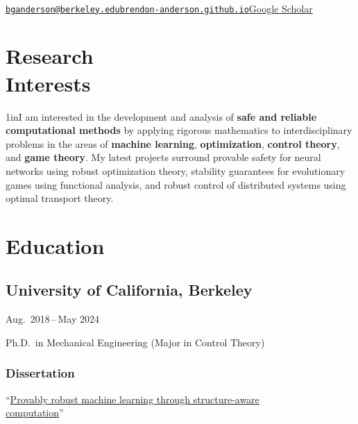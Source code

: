 \documentclass[11pt]{article}
\newcommand{\sectionwidth}{1in}		%
\renewcommand{\maketitle}{%
	\begin{center}
		{\huge\bfseries\theauthor}\\
		\vspace*{1em}%
		{\href{mailto:\theemail}{\texttt{\theemail}}\qquad\href{https://\thewebsite}{\texttt{\thewebsite}}\qquad\href{\thescholar}{Google Scholar}}\\
		\vspace*{0em}%
	\end{center}%
}							%
\newcommand{\cvdates}[2]{\hfill#1\,--\,#2}	%
\begin{document}
	
	\title{}
	\date{}
	\author{Brendon G.\ Anderson}
	\newcommand{\theemail}{bganderson@berkeley.edu}
	\newcommand{\thephone}{(760) 473-3007}
	\newcommand{\thewebsite}{brendon-anderson.github.io}
	\newcommand{\thescholar}{https://scholar.google.com/citations?user=-zepUjMAAAAJ&hl=en&oi=ao}
	\maketitle

	\section{\texorpdfstring{Research \\[\baselineskip] Interests}{Research Interests}}
	\hfill\vspace*{-2\baselineskip}

	\begin{adjustwidth}{\sectionwidth}{}I am interested in the development and analysis of \textbf{safe and reliable computational methods} by applying rigorous mathematics to interdisciplinary problems in the areas of \textbf{machine learning}, \textbf{optimization}, \textbf{control theory}, and \textbf{game theory}. My latest projects surround provable safety for neural networks using robust optimization theory, stability guarantees for evolutionary games using functional analysis, and robust control of distributed systems using optimal transport theory.\end{adjustwidth}
	
	\section{Education}
	\subsection{University of California, Berkeley}
	\cvdates{Aug.\ 2018}{May 2024}
	
	\hspace*{\sectionwidth}Ph.D.\ in Mechanical Engineering (Major in Control Theory)

	\subsubsection{Dissertation}
	``\href{https://brendon-anderson.github.io/files/publications/dissertation.pdf}{Provably robust machine learning through structure-aware \\
	\hspace*{\sectionwidth}computation}''
\end{document}
